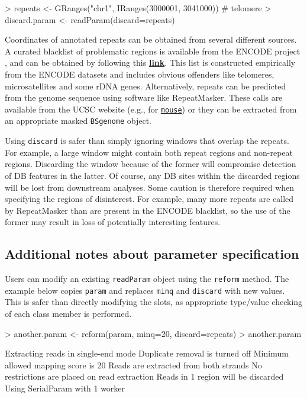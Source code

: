 \documentclass[12pt]{report}
\renewenvironment{Schunk}{\vspace{0pt}}{\vspace{0pt}}
\newcommand{\code}[1]{{\small\texttt{#1}}}
\begin{document}
\begin{Schunk}
\begin{Sinput}
> repeats <- GRanges("chr1", IRanges(3000001, 3041000)) # telomere
> discard.param <- readParam(discard=repeats)
\end{Sinput}
\end{Schunk}

Coordinates of annotated repeats can be obtained from several different sources.
A curated blacklist of problematic regions is available from the ENCODE project \citep{dunham2012}, and can be obtained by following this \href{https://sites.google.com/site/anshulkundaje/projects/blacklists}{\textbf{link}}.
This list is constructed empirically from the ENCODE datasets and includes obvious offenders like telomeres, microsatellites and some rDNA genes.
Alternatively, repeats can be predicted from the genome sequence using software like RepeatMasker.
These calls are available from the UCSC website (e.g., for \href{hgdownload.soe.ucsc.edu/goldenPath/mm10/bigZips/chromOut.tar.gz}{\texttt{mouse}}) or they can be extracted from an appropriate masked \code{BSgenome} object. 

Using \code{discard} is safer than simply ignoring windows that overlap the repeats. 
For example, a large window might contain both repeat regions and non-repeat regions. 
Discarding the window because of the former will compromise detection of DB features in the latter. 
Of course, any DB sites within the discarded regions will be lost from downstream analyses.  
Some caution is therefore required when specifying the regions of disinterest.
For example, many more repeats are called by RepeatMasker than are present in the ENCODE blacklist, so the use of the former may result in loss of potentially interesting features.

\subsection{Additional notes about parameter specification}
Users can modify an existing \code{readParam} object using the \code{reform} method.
The example below copies \code{param} and replaces \code{minq} and \code{discard} with new values.
This is safer than directly modifying the slots, as appropriate type/value checking of each class member is performed.

\begin{Schunk}
\begin{Sinput}
> another.param <- reform(param, minq=20, discard=repeats)
> another.param
\end{Sinput}
\begin{Soutput}
    Extracting reads in single-end mode
    Duplicate removal is turned off 
    Minimum allowed mapping score is 20 
    Reads are extracted from both strands
    No restrictions are placed on read extraction
    Reads in 1 region will be discarded
    Using SerialParam with 1 worker
\end{Soutput}
\end{Schunk}
\end{document}
